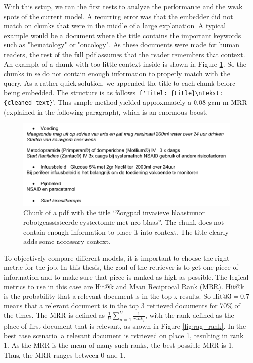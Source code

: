 With this setup, we ran the first tests to analyze the performance and the weak spots of the current model. A recurring error was that the embedder did not match on chunks that were in the middle of a large explanation. A typical example would be a document where the title contains the important keywords such as "hematology" or "oncology". As these documents were made for human readers, the rest of the full pdf assumes that the reader remembers that context. An example of a chunk with too little context inside is shown in Figure \ref{fig:out_of_context_zenya_doc}. So the chunks in se do not contain enough information to properly match with the query. As a rather quick solution, we appended the title to each chunk before being embedded. The structure is as follows: \verb|f'Titel: {title}\nTekst: {cleaned_text}|'. This simple method yielded approximately a 0.08 gain in MRR (explained in the following paragraph), which is an enormous boost.

\begin{figure}[h]
    \centerline{\includegraphics[width=1\linewidth]{fig/out_of_context_zenya_doc.png}}
    \caption{Chunk of a pdf with the title ``Zorgpad invasieve blaastumor robotgeassisteerde cystectomie met neo-blaas''. The chunk does not contain enough information to place it into context. The title clearly adds some necessary context.}
    \label{fig:out_of_context_zenya_doc}
\end{figure}

To objectively compare different models, it is important to choose the right metric for the job. In this thesis, the goal of the retriever is to get one piece of information and to make sure that piece is ranked as high as possible. The logical metrics to use in this case are Hit@k and Mean Reciprocal Rank (MRR). Hit@k is the probability that a relevant document is in the top k results. So Hit@3$=0.7$ means that a relevant document is in the top 3 retrieved documents for 70\% of the times. The MRR is defined as $\frac{1}{U} \sum_{u=1}^U \frac{1}{rank_i}$, with the rank defined as the place of first document that is relevant, as shown in Figure \ref{fig:rag_rank}. In the best case scenario, a relevant document is retrieved on place 1, resulting in rank 1. As the MRR is the mean of many such ranks, the best possible MRR is 1. Thus, the MRR ranges between 0 and 1.

